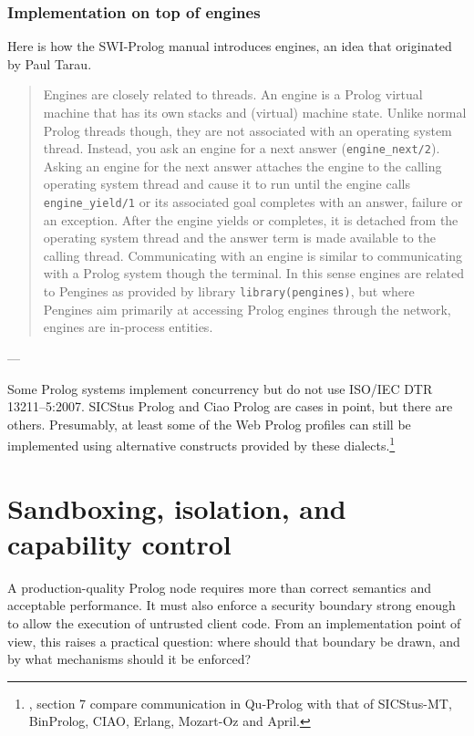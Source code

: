 \subsubsection{Implementation on top of engines}


\noindent Here is how the SWI-Prolog manual introduces engines, an idea that originated by Paul Tarau. %

\begin{quote}
Engines are closely related to threads. An engine is a Prolog virtual machine that has its own stacks and (virtual) machine state. Unlike normal Prolog threads though, they are not associated with an operating system thread. Instead, you ask an engine for a next answer (\texttt{engine\_next/2}). Asking an engine for the next answer attaches the engine to the calling operating system thread and cause it to run until the engine calls \texttt{engine\_yield/1} or its associated goal completes with an answer, failure or an exception. After the engine yields or completes, it is detached from the operating system thread and the answer term is made available to the calling thread. Communicating with an engine is similar to communicating with a Prolog system though the terminal. In this sense engines are related to Pengines as provided by library \texttt{library(pengines)}, but where Pengines aim primarily at accessing Prolog engines through the network, engines are in-process entities.
\end{quote}

---

Some Prolog systems implement concurrency but do not use ISO/IEC DTR 13211--5:2007. SICStus Prolog and Ciao Prolog are cases in point, but there are others. Presumably, at least some of the Web Prolog profiles can still be implemented using alternative constructs provided by these dialects.\footnote{\cite{quprolog:article}, section 7 compare communication in Qu-Prolog with that of SICStus-MT, BinProlog, CIAO, Erlang, Mozart-Oz and April.}

\section{Sandboxing, isolation, and capability control}\label{sec:implementation-security}

A production-quality Prolog node requires more than correct semantics and acceptable performance. It must also enforce a security boundary strong enough to allow the execution of untrusted client code. From an implementation point of view, this raises a practical question: where should that boundary be drawn, and by what mechanisms should it be enforced?

